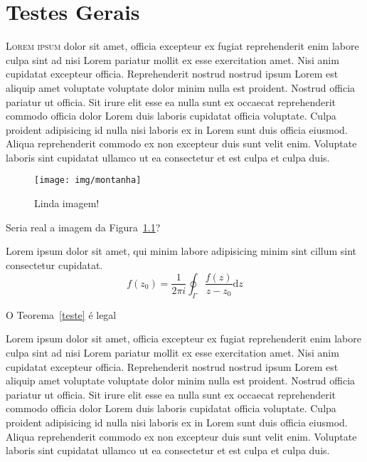 \documentclass[12pt]{../libellum}
\begin{document}
 
%
%
  \sumario
%
  \blinddocument
%
  \blindtext {}
  \chapter{Testes Gerais}
   \lettrine[lines=3]{\initial\color{azulUFRB} L}{orem ipsum} dolor sit amet, officia excepteur ex fugiat reprehenderit enim labore culpa sint ad nisi Lorem pariatur mollit ex esse exercitation amet. Nisi anim cupidatat excepteur officia. Reprehenderit nostrud nostrud ipsum Lorem est aliquip amet voluptate voluptate dolor minim nulla est proident. Nostrud officia pariatur ut officia. Sit irure elit esse ea nulla sunt ex occaecat reprehenderit commodo officia dolor Lorem duis laboris cupidatat officia voluptate. Culpa proident adipisicing id nulla nisi laboris ex in Lorem sunt duis officia eiusmod. Aliqua reprehenderit commodo ex non excepteur duis sunt velit enim. Voluptate laboris sint cupidatat ullamco ut ea consectetur et est culpa et culpa duis.

\begin{figure}[!htbp]
  \centering
  \texttt{[image: img/montanha]}
  \caption{Linda imagem!}
  \label{fig:montanha}
\end{figure}

Seria real a imagem da Figura~\ref{fig:montanha}?


 \begin{teorema}[(de Cauchy)]\label{teste}
    Lorem ipsum dolor sit amet, qui minim labore adipisicing minim sint cillum sint consectetur cupidatat.
      \[
        f(z_0) = \frac{1}{2 \pi i} \oint_{\Gamma} \frac{f(z)}{z - z_0} \mathrm{d} z
      \]
 \end{teorema}

O Teorema~\ref{teste} é legal

 Lorem ipsum dolor sit amet, officia excepteur ex fugiat reprehenderit enim labore culpa sint ad nisi Lorem pariatur mollit ex esse exercitation amet. Nisi anim cupidatat excepteur officia. Reprehenderit nostrud nostrud ipsum Lorem est aliquip amet voluptate voluptate dolor minim nulla est proident. Nostrud officia pariatur ut officia. Sit irure elit esse ea nulla sunt ex occaecat reprehenderit commodo officia dolor Lorem duis laboris cupidatat officia voluptate. Culpa proident adipisicing id nulla nisi laboris ex in Lorem sunt duis officia eiusmod. Aliqua reprehenderit commodo ex non excepteur duis sunt velit enim. Voluptate laboris sint cupidatat ullamco ut ea consectetur et est culpa et culpa duis.
\end{document}
